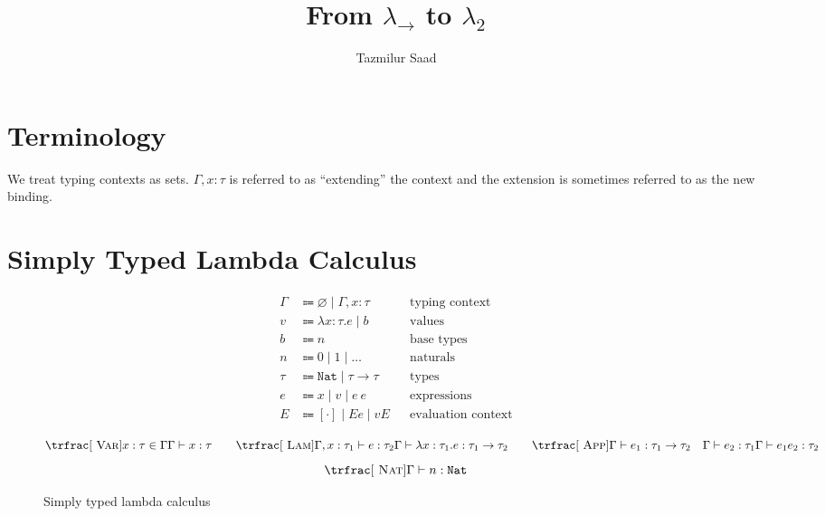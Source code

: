 \documentclass[nonacm]{acmart}
\newcommand{\nat}{\texttt{Nat}}
\begin{document}
\title{From \(\lambda_{\rightarrow}\) to \(\lambda_2\)}


\author{Tazmilur Saad}

\makeatletter\@printpermissionfalse\makeatother
\makeatletter\@printcopyrightfalse\makeatother


\maketitle

\section*{Terminology}

We treat typing contexts as sets. \(\Gamma, x : \tau \) is referred to as
``extending'' the context and the extension is sometimes referred to as the new
binding.

\section{Simply Typed Lambda Calculus}

\begin{figure}
  \begin{framed}
    \begin{align*}
      \Gamma & \Coloneqq \varnothing \mid \Gamma, x : \tau &  & \text{typing context}     \\
      v      & \Coloneqq \lambda x : \tau . e \mid b       &  & \text{values}             \\
      b      & \Coloneqq n                                 &  & \text{base types}         \\
      n      & \Coloneqq 0 \mid 1 \mid \dots               &  & \text{naturals}           \\
      \tau   & \Coloneqq \nat \mid \tau \rightarrow \tau   &  & \text{types}              \\
      e      & \Coloneqq x \mid v \mid e~e                 &  & \text{expressions}        \\
      E      & \Coloneqq [\cdot] \mid E e \mid v E         &  & \text{evaluation context}
    \end{align*}

    \[
      \trfrac[~\textsc{Var}]{x : \tau \in \Gamma}{\Gamma \vdash x : \tau}
      \qquad
      \trfrac[~\textsc{Lam}]{\Gamma, x : \tau_1 \vdash e : \tau_2}{\Gamma \vdash \lambda x : \tau_1 . e : \tau_{1} \rightarrow \tau_2}
      \qquad
      \trfrac[~\textsc{App}]{\Gamma \vdash e_1 : \tau_1 \rightarrow \tau_2 \quad \Gamma \vdash e_{2} : \tau_1}{\Gamma \vdash e_{1} e_{2} : \tau_2}
    \]
    \[
      \trfrac[~\textsc{Nat}]{}{\Gamma \vdash n : \nat}
    \]
  \end{framed}
  \caption{Simply typed lambda calculus}
  \label{fig:stlc}
\end{figure}
\end{document}
